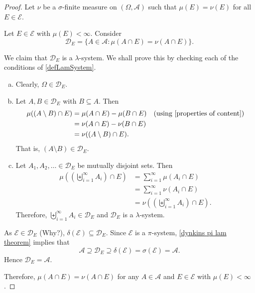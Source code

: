 \begin{proof}
    Let $\nu$ be a $\sigma$-finite measure on $(\Omega,\mathcal{A})$ such that $\mu(E)=\nu(E)$ for all $E\in\mathcal{E}$.
    
    \vspace{1mm}
    Let $E\in\mathcal{E}$ with $\mu(E)<\infty$. Consider
    $$\mathcal{D}_E=\{A\in\mathcal{A}: \mu(A\cap E)=\nu(A\cap E)\}.$$
    
    We claim that $\mathcal{D}_E$ is a $\lambda$-system. We shall prove this by checking each of the conditions of \ref{defLamSystem}.
    
    \begin{enumerate}[(a)]
        \item Clearly, $\Omega\in\mathcal{D}_E$.
        \item Let $A,B\in\mathcal{D}_E$ with $B\subseteq A$. Then
        \begin{align*}
            \mu((A\setminus B)\cap E) &= \mu(A\cap E) - \mu(B\cap E)\quad\text{(using \ref{properties of content})} \\
            &= \nu(A\cap E) - \nu(B\cap E) \\
            &= \nu((A\setminus B)\cap E).
        \end{align*}
        That is, $(A\setminus B)\in\mathcal{D}_E$.
        \item Let $A_1,A_2,\ldots\in\mathcal{D}_E$ be mutually disjoint sets. Then
        \begin{align*}
            \mu\left(\left(\biguplus_{i=1}^\infty A_i\right)\cap E\right) &= \sum_{i=1}^\infty \mu(A_i\cap E) \\
            &= \sum_{i=1}^\infty\nu(A_i\cap E) \\
            &= \nu\left(\left(\biguplus_{i=1}^\infty A_i\right)\cap E\right).
        \end{align*}
        Therefore, $\biguplus_{i=1}^\infty A_i\in\mathcal{D}_E$ and $\mathcal{D}_E$ is a $\lambda$-system.
    \end{enumerate}
    As $\mathcal{E}\in\mathcal{D}_E$ (Why?), $\delta(\mathcal{E})\subseteq\mathcal{D}_E$. Since $\mathcal{E}$ is a $\pi$-system, \ref{dynkins pi lam theorem} implies that
    $$\mathcal{A}\supseteq\mathcal{D}_E\supseteq\delta(\mathcal{E})=\sigma(\mathcal{E})=\mathcal{A}.$$
    Hence $\mathcal{D}_E=\mathcal{A}$.
    
    Therefore, $\mu(A\cap E)=\nu(A\cap E)$ for any $A\in\mathcal{A}$ and $E\in\mathcal{E}$ with $\mu(E)<\infty$.
    

\end{proof}
